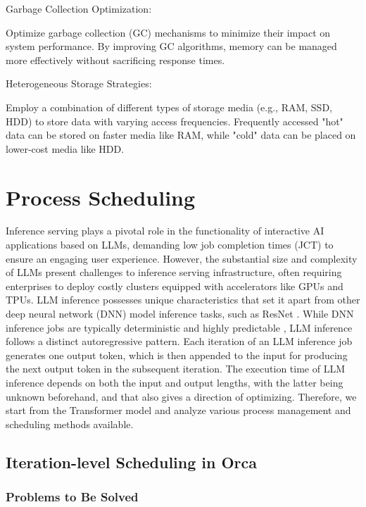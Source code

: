 \documentclass[conference]{IEEEtran}
\begin{document}
Garbage Collection Optimization:

Optimize garbage collection (GC) mechanisms to minimize their impact on system performance. By improving GC algorithms, memory can be managed more effectively without sacrificing response times.

Heterogeneous Storage Strategies:

Employ a combination of different types of storage media (e.g., RAM, SSD, HDD) to store data with varying access frequencies. Frequently accessed "hot" data can be stored on faster media like RAM, while "cold" data can be placed on lower-cost media like HDD.



\section{Process Scheduling}

Inference serving plays a pivotal role in the functionality of interactive AI applications based on LLMs, demanding low job completion times (JCT) to ensure an engaging user experience. However, the substantial size and complexity of LLMs present challenges to inference serving infrastructure, often requiring enterprises to deploy costly clusters equipped with accelerators like GPUs and TPUs. LLM inference possesses unique characteristics that set it apart from other deep neural network (DNN) model inference tasks, such as ResNet \cite{b15}. While DNN inference jobs are typically deterministic and highly predictable \cite{b16}, LLM inference follows a distinct autoregressive pattern. Each iteration of an LLM inference job generates one output token, which is then appended to the input for producing the next output token in the subsequent iteration. The execution time of LLM inference depends on both the input and output lengths, with the latter being unknown beforehand, and that also gives a direction of optimizing.
Therefore, we start from the Transformer model and analyze various process management and scheduling methods available.


\subsection{Iteration-level Scheduling in Orca}
\subsubsection{Problems to Be Solved}
\end{document}
